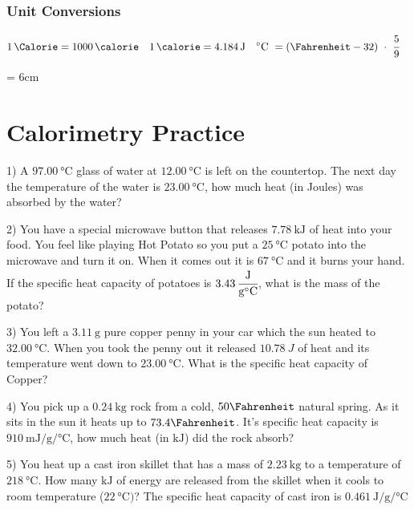 \documentclass[12pt, oneside, letterpaper]{book}
\begin{document}
\subsubsection{Unit Conversions}
\begin{align*}
    & \SI{1}{\Calorie} = \qty{1000}{\calorie} & \qty{1}{\calorie} = \qty{4.184}{\joule} && \si{\degreeCelsius}\ = (\Fahrenheit - 32)\  \cdot \ \cfrac{5}{9} & 
\end{align*}

\newpage
\parskip = 6cm

\section{Calorimetry Practice} 

1) A $\qty{97.00}{\degreeCelsius}$ glass of water at $\qty{12.00}{\degreeCelsius}$ is left on the countertop. The next day the temperature of the water is $\qty{23.00}{\degreeCelsius}$, how much heat (in Joules) was absorbed by the water?


2) You have a special microwave button that releases $\qty{7.78}{\kilo\joule}$ of heat into your food. You feel like playing Hot Potato so you put a $\qty{25}{\degreeCelsius}$ potato into the microwave and turn it on. When it comes out it is $\qty{67}{\degreeCelsius}$ and it burns your hand. If the specific heat capacity of potatoes is $\qty{3.43}{  \cfrac{\joule}{\gram\degreeCelsius}}$, what is the mass of the potato?


3) You left a $\qty{3.11}{\gram}$ pure copper penny in your car which the sun heated to $\qty{32.00}{\degreeCelsius}$. When you took the penny out it released $\qty{10.78}{J}$ of heat and its temperature went down to $\qty{23.00}{\degreeCelsius}$. What is the specific heat capacity of Copper?


4) You pick up a $\qty{0.24}{\kilo\gram}$ rock from a cold, $50 \Fahrenheit$ natural spring. As it sits in the sun it heats up to $73.4 \Fahrenheit$. It's specific heat capacity is $\qty[per-mode=fraction]{910}{\milli\joule\per\gram\per \degreeCelsius}$, how much heat (in $\si{\kilo\joule}$) did the rock absorb?


5) You heat up a cast iron skillet that has a mass of $\qty{2.23}{\kilo\gram}$ to a temperature of $\qty{218}{\degreeCelsius}$. How many $\si{\kilo\joule}$ of energy are released from the skillet when it cools to room temperature ($\qty{22}{\degreeCelsius})$? The specific heat capacity of cast iron is $\qty[per-mode=fraction]{0.461}{\joule\per\gram\per\degreeCelsius}$
\end{document}
